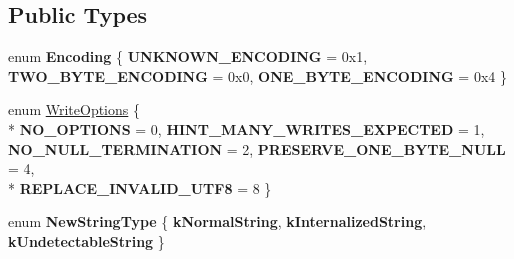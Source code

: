 \subsection*{Public Types}
\begin{DoxyCompactItemize}
\item 
\hypertarget{classv8_1_1String_a2f4a2e9516c246eef602b889ce049c49}{}enum {\bfseries Encoding} \{ {\bfseries U\+N\+K\+N\+O\+W\+N\+\_\+\+E\+N\+C\+O\+D\+I\+N\+G} = 0x1, 
{\bfseries T\+W\+O\+\_\+\+B\+Y\+T\+E\+\_\+\+E\+N\+C\+O\+D\+I\+N\+G} = 0x0, 
{\bfseries O\+N\+E\+\_\+\+B\+Y\+T\+E\+\_\+\+E\+N\+C\+O\+D\+I\+N\+G} = 0x4
 \}\label{classv8_1_1String_a2f4a2e9516c246eef602b889ce049c49}

\item 
enum \hyperlink{classv8_1_1String_a9ce7f1458ffd08f8eb2b9c8dc056e616}{Write\+Options} \{ \\*
{\bfseries N\+O\+\_\+\+O\+P\+T\+I\+O\+N\+S} = 0, 
{\bfseries H\+I\+N\+T\+\_\+\+M\+A\+N\+Y\+\_\+\+W\+R\+I\+T\+E\+S\+\_\+\+E\+X\+P\+E\+C\+T\+E\+D} = 1, 
{\bfseries N\+O\+\_\+\+N\+U\+L\+L\+\_\+\+T\+E\+R\+M\+I\+N\+A\+T\+I\+O\+N} = 2, 
{\bfseries P\+R\+E\+S\+E\+R\+V\+E\+\_\+\+O\+N\+E\+\_\+\+B\+Y\+T\+E\+\_\+\+N\+U\+L\+L} = 4, 
\\*
{\bfseries R\+E\+P\+L\+A\+C\+E\+\_\+\+I\+N\+V\+A\+L\+I\+D\+\_\+\+U\+T\+F8} = 8
 \}
\item 
\hypertarget{classv8_1_1String_a37620fb9fdc9b72ec9eea2a2aafaddee}{}enum {\bfseries New\+String\+Type} \{ {\bfseries k\+Normal\+String}, 
{\bfseries k\+Internalized\+String}, 
{\bfseries k\+Undetectable\+String}
 \}\label{classv8_1_1String_a37620fb9fdc9b72ec9eea2a2aafaddee}

\end{DoxyCompactItemize}
